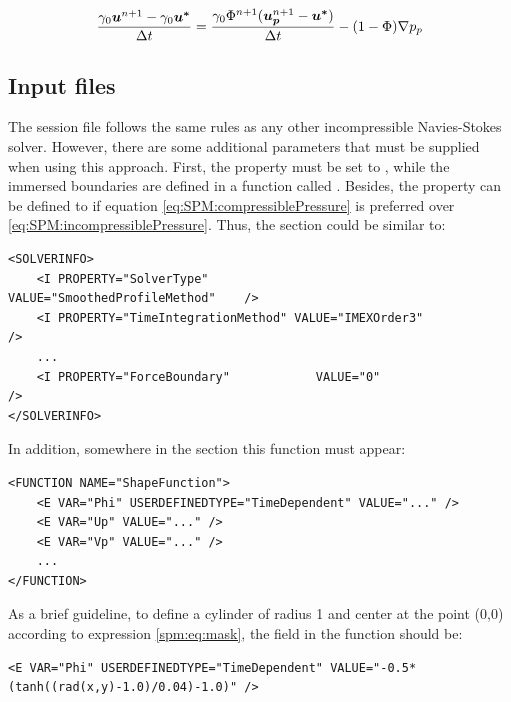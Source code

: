 \begin{equation} \label{eq:SPM:compressiblePressure}
    \frac{\gamma_0\boldsymbol{u}^{n+1}-\gamma_0\boldsymbol{u^*}}{\Delta t} = \frac{\gamma_0\Phi^{n+1}(\boldsymbol{u_p}^{n+1}-\boldsymbol{u^*})}{\Delta t} -(1-\Phi) \nabla p_p
\end{equation}

\subsection{Input files}

The session file follows the same rules as any other incompressible Navies-Stokes solver. However, there are some additional parameters that must be supplied when using this approach. First, the property  must be set to , while the immersed boundaries are defined in a function called . Besides, the property  can be defined to  if equation \eqref{eq:SPM:compressiblePressure} is preferred over \eqref{eq:SPM:incompressiblePressure}. Thus, the  section could be similar to:

\begin{lstlisting}[style=XMLStyle]
<SOLVERINFO>
    <I PROPERTY="SolverType"                 VALUE="SmoothedProfileMethod"    />
    <I PROPERTY="TimeIntegrationMethod" VALUE="IMEXOrder3"                   />
    ...
    <I PROPERTY="ForceBoundary"            VALUE="0"                                 />
</SOLVERINFO>
\end{lstlisting}

In addition, somewhere in the  section this function must appear:

\begin{lstlisting}[style=XMLStyle]
<FUNCTION NAME="ShapeFunction">
    <E VAR="Phi" USERDEFINEDTYPE="TimeDependent" VALUE="..." />
    <E VAR="Up" VALUE="..." />
    <E VAR="Vp" VALUE="..." />
    ...
</FUNCTION>
\end{lstlisting}

As a brief guideline, to define a cylinder of radius 1 and center at the point (0,0) according to expression \eqref{spm:eq:mask}, the  field in the  function should be:

\begin{lstlisting}[style=XMLStyle]
    <E VAR="Phi" USERDEFINEDTYPE="TimeDependent" VALUE="-0.5*(tanh((rad(x,y)-1.0)/0.04)-1.0)" />
\end{lstlisting}

